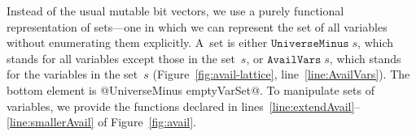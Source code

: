 \documentclass[blockstyle,preprint,natbib,nocopyrightspace]{sigplanconf}
\newcommand\lineref[1]{line~\ref{line:#1}}
\newcommand\linerangeref[2]{\mbox{lines~\ref{line:#1}--\ref{line:#2}}}
\def\authornote#1{\unskip\relax}
\newcommand{\john}[1]{\authornote{JD: #1}}
\newcommand\figref[1]{Figure~\ref{fig:#1}}
\begin{document}


Instead of the usual mutable bit vectors, we use a purely functional
representation of sets---one in which we can represent the set of all
variables without enumerating them explicitly.
A~set is either 
$\mathtt{UniverseMinus}\;s$, which stands for all variables except
those in the set~$s$,
or $\mathtt{AvailVars}\;s$, which stands for the variables in the set~$s$
(\figref{avail-lattice}, \lineref{AvailVars}).
%
%
The bottom element is @UniverseMinus emptyVarSet@.
To manipulate sets of variables, we provide the functions declared in
\linerangeref{extendAvail}{smallerAvail} of \figref{avail}.
%





\end{document}
